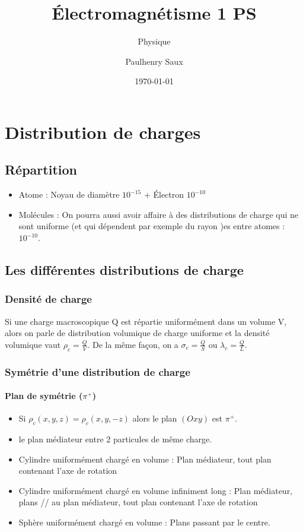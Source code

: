 \documentclass[french]{yLectureNote}
\title{Électromagnétisme 1 PS}
\subtitle{Physique}
\author{Paulhenry Saux}
\date{\today}
\begin{document}
\chapter{Distribution de charges}
\section{Répartition}
\begin{itemize}
 \item Atome : Noyau de diamètre \(10^{-15}\) + Électron \(10^{-10}\)
 \item Molécules : On pourra aussi avoir affaire à des distributions de charge qui ne sont uniforme (et qui dépendent par exemple du rayon )es entre atomes  :  \(10^{-10}\).
\end{itemize}
\section{Les différentes distributions de charge}
\subsection{Densité de charge}
Si une charge macroscopique Q est répartie uniformément dans un volume V, alors on parle de distribution volumique de charge uniforme et la densité volumique vaut \(\rho_c = \frac{Q}{V}\). De la m\^eme façon, on a \(\sigma_c = \frac{Q}{S}\) ou \(\lambda_c = \frac{Q}{L}\).
\subsection{Symétrie d'une distribution de charge}
\subsubsection{Plan de symétrie (\(\pi^+\))}
\begin{itemize}
 \item Si \(\rho_c(x,y,z) = \rho_c(x,y,-z)\) alors le plan \((Oxy)\) est \(\pi^+\).
 \item le plan médiateur entre 2 particules de m\^eme charge.
 \item Cylindre uniformément chargé en volume : Plan médiateur, tout plan contenant l'axe de rotation
 \item Cylindre uniformément chargé en volume infiniment long : Plan médiateur, plans // au plan médiateur, tout plan contenant l'axe de rotation
 \item Sphère uniformément chargé en volume : Plans passant par le centre.
\end{itemize}
\end{document}

